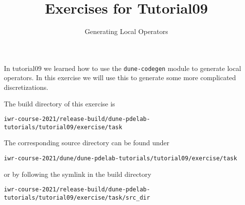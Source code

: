 \documentclass[12pt,a4paper]{article}
\title{\textbf{Exercises for Tutorial09}}
\subtitle{Generating Local Operators}
\begin{document}
\exerciseheader

In tutorial09 we learned how to use the \lstinline{dune-codegen} module to
generate local operators. In this exercise we will use this to generate some
more complicated discretizations.

The build directory of this exercise is
\begin{lstlisting}
iwr-course-2021/release-build/dune-pdelab-tutorials/tutorial09/exercise/task
\end{lstlisting}

The corresponding source directory can be found under
\begin{lstlisting}
iwr-course-2021/dune/dune-pdelab-tutorials/tutorial09/exercise/task
\end{lstlisting}
or by following the symlink in the build directory
\begin{lstlisting}
iwr-course-2021/release-build/dune-pdelab-tutorials/tutorial09/exercise/task/src_dir
\end{lstlisting}
\end{document}
